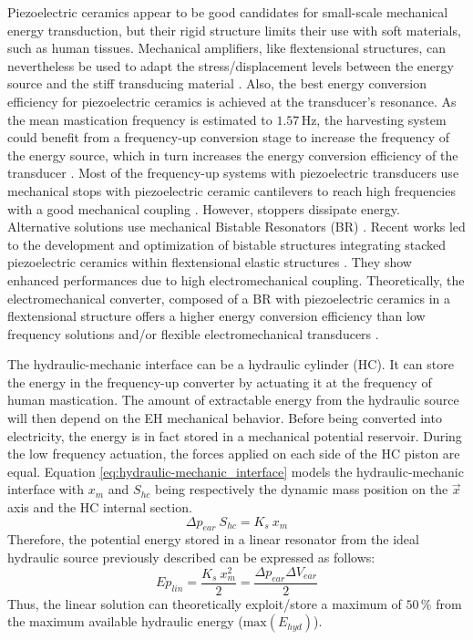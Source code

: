 \documentclass[3p,twocolumn,preprint]{elsarticle}
\begin{document}
Piezoelectric ceramics appear to be good candidates for small-scale mechanical energy transduction, but their rigid structure limits their use with soft materials, such as human tissues. Mechanical amplifiers, like flextensional structures, can nevertheless be used to adapt the stress/displacement levels between the energy source and the stiff transducing material \cite{Abdelnaby2016}. Also, the best energy conversion efficiency for piezoelectric ceramics is achieved at the transducer's resonance. As the mean mastication frequency is estimated to \mbox{$1.57$\,Hz}, the harvesting system could benefit from a frequency-up conversion stage to increase the frequency of the energy source, which in turn increases the energy conversion efficiency of the transducer \cite{Ashraf2011,Peng2021}. Most of the frequency-up systems with piezoelectric transducers use mechanical stops with piezoelectric ceramic cantilevers to reach high frequencies with a good mechanical coupling \cite{Edwards2013,Gu2011,Lee2007}. However, stoppers dissipate energy. Alternative solutions use mechanical Bistable Resonators (BR) \cite{Vocca2012}. Recent works led to the development and optimization of bistable structures integrating stacked piezoelectric ceramics within flextensional elastic structures \cite{Huguet2017}. They show enhanced performances due to high electromechanical coupling. Theoretically, the electromechanical converter, composed of a BR with piezoelectric ceramics in a flextensional structure offers a higher energy conversion efficiency than low frequency solutions and/or flexible electromechanical transducers \cite{Abdelnaby2016,Peng2021}.

The hydraulic-mechanic interface can be a hydraulic cylinder (HC). It can store the energy in the frequency-up converter by actuating it at the frequency of human mastication. The amount of extractable energy from the hydraulic source will then depend on the EH mechanical behavior. Before being converted into electricity, the energy is in fact stored in a mechanical potential reservoir. During the low frequency actuation, the forces applied on each side of the HC piston are equal. Equation \ref{eq:hydraulic-mechanic_interface} models the hydraulic-mechanic interface with $x_{m}$ and $ S_{hc}$ being respectively the dynamic mass position on the $\vec{x}$ axis and the HC internal section.
\begin{equation}
	\Delta p_{ear}\ S_{hc} = K_{s}\ x_{m}
	\label{eq:hydraulic-mechanic_interface}
\end{equation}
Therefore, the potential energy stored in a linear resonator from the ideal hydraulic source previously described can be expressed as follows:
\begin{equation}
	Ep_{lin} = \dfrac{K_s\ x_{m}^2}{2} = \dfrac{\Delta p_{ear} \Delta V_{ear}}{2}
	\label{eq:best_linear_soution}
\end{equation}
Thus, the linear solution can theoretically exploit/store a maximum of $50\,\%$ from the maximum available hydraulic energy ($\text{max}(E_{hyd})$). 
\end{document}
